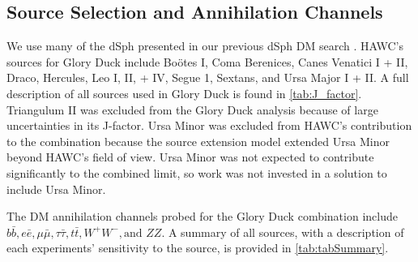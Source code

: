 \subsection{Source Selection and Annihilation Channels}

We use many of the dSph presented in our previous dSph DM search \cite{Albert_2018}.
HAWC's sources for Glory Duck include Boötes I, Coma Berenices, Canes Venatici I + II, Draco, Hercules, Leo I, II, + IV, Segue 1, Sextans, and Ursa Major I + II.
A full description of all sources used in Glory Duck is found in \cref{tab:J_factor}.
Triangulum II was excluded from the Glory Duck analysis because of large uncertainties in its J-factor.
Ursa Minor was excluded from HAWC's contribution to the combination because the source extension model extended Ursa Minor beyond HAWC's field of view.
Ursa Minor was not expected to contribute significantly to the combined limit, so work was not invested in a solution to include Ursa Minor.

The DM annihilation channels probed for the Glory Duck combination include $b\bar{b}, e\bar{e}, \mu\bar{\mu}, \tau\bar{\tau}, t\bar{t}, W^+W^-, \textrm{and }ZZ$.
A summary of all sources, with a description of each experiments' sensitivity to the source, is provided in \cref{tab:tabSummary}.







